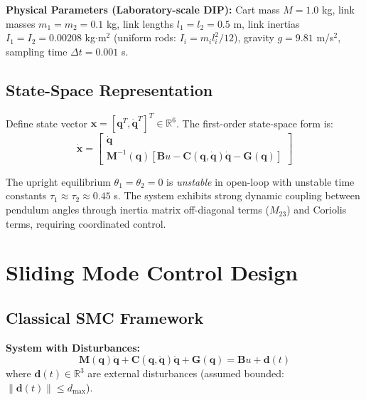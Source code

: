 \documentclass[conference]{IEEEtran}
\begin{document}
\textbf{Physical Parameters (Laboratory-scale DIP):} Cart mass $M = 1.0$ kg, link masses $m_1 = m_2 = 0.1$ kg, link lengths $l_1 = l_2 = 0.5$ m, link inertias $I_1 = I_2 = 0.00208$ kg$\cdot$m$^2$ (uniform rods: $I_i = m_i l_i^2/12$), gravity $g = 9.81$ m/s$^2$, sampling time $\Delta t = 0.001$ s.

\subsection{State-Space Representation}

Define state vector $\mathbf{x} = [\mathbf{q}^T, \dot{\mathbf{q}}^T]^T \in \mathbb{R}^6$. The first-order state-space form is:
\begin{equation}
\dot{\mathbf{x}} = \begin{bmatrix}
\dot{\mathbf{q}} \\
\mathbf{M}^{-1}(\mathbf{q})[\mathbf{B}u - \mathbf{C}(\mathbf{q}, \dot{\mathbf{q}})\dot{\mathbf{q}} - \mathbf{G}(\mathbf{q})]
\end{bmatrix}
\end{equation}

The upright equilibrium $\theta_1 = \theta_2 = 0$ is \emph{unstable} in open-loop with unstable time constants $\tau_1 \approx \tau_2 \approx 0.45$ s. The system exhibits strong dynamic coupling between pendulum angles through inertia matrix off-diagonal terms ($M_{23}$) and Coriolis terms, requiring coordinated control.

\section{Sliding Mode Control Design}

\subsection{Classical SMC Framework}

\textbf{System with Disturbances:}
\begin{equation}
\mathbf{M}(\mathbf{q})\ddot{\mathbf{q}} + \mathbf{C}(\mathbf{q}, \dot{\mathbf{q}})\dot{\mathbf{q}} + \mathbf{G}(\mathbf{q}) = \mathbf{B}u + \mathbf{d}(t)
\end{equation}
where $\mathbf{d}(t) \in \mathbb{R}^3$ are external disturbances (assumed bounded: $\|\mathbf{d}(t)\| \leq d_{\text{max}}$).
\end{document}
